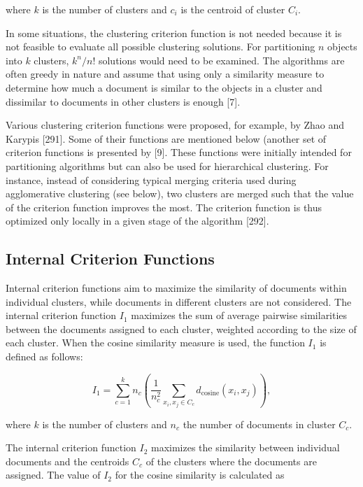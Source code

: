 \documentclass[11pt,openany,executivepaper]{book}
\begin{document}
where \( k \) is the number of clusters and \( c_i \) is the centroid of cluster \( C_i \).

In some situations, the clustering criterion function is not needed because it is not feasible to evaluate all possible clustering solutions. For partitioning \( n \) objects into \( k \) clusters, \( k^n / n!\) solutions would need to be examined. The algorithms are often greedy in nature and assume that using only a similarity measure to determine how much a document is similar to the objects in a cluster and dissimilar to documents in other clusters is enough [7].

Various clustering criterion functions were proposed, for example, by Zhao and Karypis [291]. Some of their functions are mentioned below (another set of criterion functions is presented by [9]. These functions were initially intended for partitioning algorithms but can also be used for hierarchical clustering. For instance, instead of considering typical merging criteria used during agglomerative clustering (see below), two clusters are merged such that the value of the criterion function improves the most. The criterion function is thus optimized only locally in a given stage of the algorithm [292].

\subsection{Internal Criterion Functions}
Internal criterion functions aim to maximize the similarity of documents within individual clusters, while documents in different clusters are not considered. The internal criterion function \( I_1 \) maximizes the sum of average pairwise similarities between the documents assigned to each cluster, weighted according to the size of each cluster. When the cosine similarity measure is used, the function \( I_1 \) is defined as follows:

\begin{equation}
I_1 = \sum_{c=1}^{k} 
n_c \left( 
    \frac{1}{n_c^2} 
    \sum_{x_i, x_j \in C_c} 
    d_{\text{cosine}}(x_i, x_j)
\right),
\end{equation}

where \( k \) is the number of clusters and \( n_c \) the number of documents in cluster \( C_c \).

\indent The internal criterion function \( I_2 \) maximizes the similarity between individual
documents and the centroids \( C_c \) of the clusters where the documents are assigned.
The value of \( I_2 \) for the cosine similarity is calculated as
\end{document}
